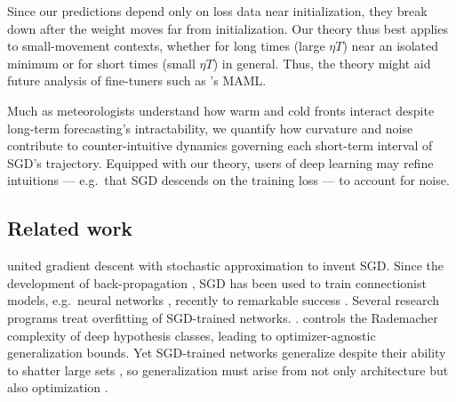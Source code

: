     
            Since our predictions depend only on loss data near initialization,
            they break down after the weight moves far from initialization.  Our
            theory thus best applies to small-movement contexts, whether for long
            times (large $\eta T$) near an isolated minimum or for short times
            (small $\eta T$) in general.
            Thus, the theory might aid future analysis of fine-tuners such as 
            \cite{fi17}'s MAML.
    
                Much as meteorologists understand how warm and cold fronts
                interact despite long-term forecasting's intractability, we
                quantify how curvature and noise contribute to
                counter-intuitive dynamics governing each short-term interval
                of SGD's trajectory.  Equipped with our theory, users of deep
                learning may refine intuitions --- e.g.\ that SGD descends on
                the training loss --- to account for noise.

        \subsection{Related work}\label{sect:related}
    

            \citet{ki52} united gradient descent \citep{ca47} with stochastic
            approximation \citep{ro51} to invent SGD.  Since the development of
            back-propagation \citep{we74}, SGD
            has been used to train connectionist models, e.g.\ neural networks
            \citep{bo91}, recently to remarkable success \citep{le15}.
            Several research programs treat overfitting of SGD-trained
            networks.  \citep{ne17a}.  \citet{ba17} controls the Rademacher
            complexity of deep hypothesis classes, leading to
            optimizer-agnostic generalization bounds.  Yet SGD-trained networks
            generalize despite their ability to shatter large sets
            \citep{zh17}, so generalization must arise from not only
            architecture but also optimization%
            \citep{ne17b}.  

